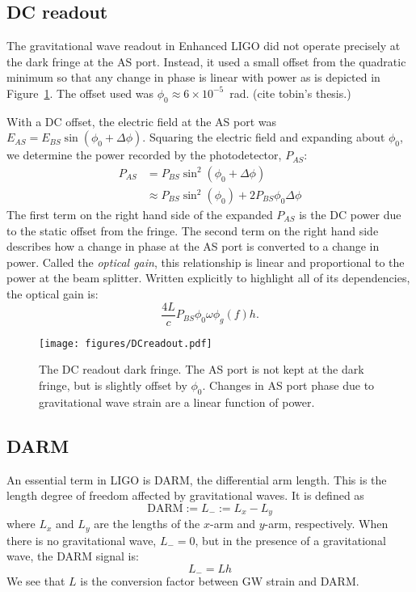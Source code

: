 \subsection{DC readout}
The gravitational wave readout in Enhanced LIGO did not operate
precisely at the dark fringe at the AS port. Instead, it used a small
offset from the quadratic minimum so that any change in phase is
linear with power as is depicted in Figure~\ref{fig:DCreadout}. The
offset used was $\phi_0 \approx 6 \times 10^{-5}$~rad. (cite tobin's
thesis.)

With a DC offset, the electric field at the AS port was $E_{AS} =
E_{BS}\sin{(\phi_0 + \Delta\phi)}$. Squaring the electric field and
expanding about $\phi_0$, we determine the power recorded by the
photodetector, $P_{AS}$:
\begin{align}
P_{AS} &= P_{BS} \sin^2{(\phi_0 + \Delta\phi)} \\
 &\approx P_{BS}\sin^2{(\phi_0)} + 2P_{BS}\phi_0\Delta\phi
\end{align}
The first term on the right hand side of the expanded $P_{AS}$ is the
DC power due to the static offset from the fringe. The second term on
the right hand side describes how a change in phase at the AS port is
converted to a change in power. Called the \emph{optical gain}, this
relationship is linear and proportional to the power at the beam
splitter. Written explicitly to highlight all of its dependencies, the
optical gain is:
\begin{equation}
\frac{4 L}{c} P_{BS} \phi_0 \omega \phi_g(f) h.
\label{eq:opticalgain}
\end{equation}

\begin{figure}
\begin{centering}
\texttt{[image: figures/DCreadout.pdf]}
\caption[The DC readout dark fringe]{The DC readout dark fringe. The
  AS port is not kept at the dark fringe, but is slightly offset by
  $\phi_0$. Changes in AS port phase due to gravitational wave strain
  are a linear function of power.}
\label{fig:DCreadout}
\end{centering}
\end{figure}



\subsection{DARM}
An essential term in LIGO is DARM, the differential arm length. This
is the length degree of freedom affected by gravitational waves. It is
defined as
\begin{equation}
\mathrm{DARM} := L_- := L_x - L_y
\end{equation}
where $L_x$ and $L_y$ are the lengths of the $x$-arm and $y$-arm,
respectively. When there is no gravitational wave, $L_-=0$, but in the
presence of a gravitational wave, the DARM signal is:
\begin{equation}
L_- = Lh
\end{equation}
We see that $L$ is the conversion factor between GW strain and DARM.





